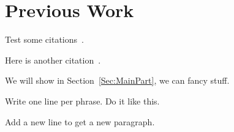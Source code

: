\section{Previous Work}\label{sec:PreviousWork}
Test some citations~\cite{Alliez03RAC,Peng05T3M,Maglo153MC}.

Here is another citation~\cite{Mlakar24EEC}.

We will show in Section~\ref{Sec:MainPart}, we can fancy stuff.

Write one line per phrase.
Do it like this.

Add a new line to get a new paragraph.
